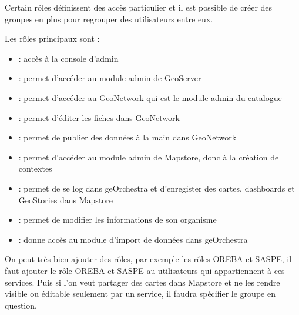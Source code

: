 \documentclass[letterpaper,10pt,french]{sphinxmanual}
\let\sphinxpxdimen\pdfpxdimen\else\newdimen\sphinxpxdimen
\begin{document}
\noindent{\hspace*{\fill}\sphinxincludegraphics[width=700\sphinxpxdimen]{{user_role}.png}\hspace*{\fill}}

\sphinxAtStartPar
Certain rôles définissent des accès particulier et il est possible de créer des groupes en plus pour regrouper des utilisateurs entre eux.

\sphinxAtStartPar
Les rôles principaux sont :
\begin{itemize}
\item {} 
\sphinxAtStartPar
{} : accès à la console d’admin

\item {} 
\sphinxAtStartPar
{} : permet d’accéder au module admin de GeoServer

\item {} 
\sphinxAtStartPar
{} : permet d’accéder au GeoNetwork qui est le module admin du catalogue

\item {} 
\sphinxAtStartPar
{} : permet d’éditer les fiches dans GeoNetwork

\item {} 
\sphinxAtStartPar
{} : permet de publier des données à la main dans GeoNetwork

\item {} 
\sphinxAtStartPar
{} : permet d’accéder au module admin de Mapstore, donc à la création de contextes

\item {} 
\sphinxAtStartPar
{} : permet de se log dans geOrchestra et d’enregister des cartes, dashboards et GeoStories dans Mapstore

\item {} 
\sphinxAtStartPar
{} : permet de modifier les informations de son organisme

\item {} 
\sphinxAtStartPar
{} : donne accès au module d’import de données dans geOrchestra

\end{itemize}

\sphinxAtStartPar
On peut très bien ajouter des rôles, par exemple les rôles OREBA et SASPE, il faut ajouter le rôle OREBA et SASPE au utilisateurs qui appartiennent à ces services.
Puis si l’on veut partager des cartes dans Mapstore et ne les rendre visible ou éditable seulement par un service, il faudra spécifier le groupe en question.
\end{document}

